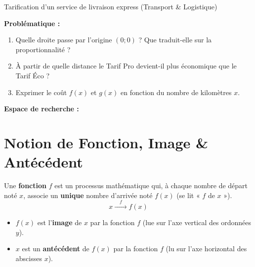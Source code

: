 \begin{activite}{Tarification d'un service de livraison express (Transport \& Logistique)}
\begin{minipage}[c]{0.48\linewidth}
\end{minipage}\hfill
\begin{minipage}[c]{0.50\linewidth}
\begin{tcolorbox}[colback=slate100, colframe=colPrimary, arc=4pt, boxrule=0.8pt, top=4pt, bottom=4pt, left=6pt, right=6pt]
\sffamily\footnotesize
\textbf{Problématique :}
\begin{enumerate}[leftmargin=1.2em, itemsep=2pt]
    \item Quelle droite passe par l'origine $(0;0)$ ? Que traduit-elle sur la proportionnalité ?
    \item À partir de quelle distance le Tarif Pro devient-il plus économique que le Tarif Éco ?
    \item Exprimer le coût $f(x)$ et $g(x)$ en fonction du nombre de kilomètres $x$.
\end{enumerate}
\end{tcolorbox}
\end{minipage}

\vspace{2mm}
\noindent\textbf{Espace de recherche :}
\lignesreponse[3]
\end{activite}

\section{Notion de Fonction, Image \& Antécédent}

\begin{cadredef}
Une \textbf{fonction} $f$ est un processus mathématique qui, à chaque nombre de départ noté $x$, associe un \textbf{unique} nombre d'arrivée noté $f(x)$ (se lit « $f$ de $x$ »).
\[ x \xrightarrow{\quad f \quad} f(x) \]
\begin{itemize}[leftmargin=1.5em, itemsep=2pt]
    \item $f(x)$ est l'\textbf{image} de $x$ par la fonction $f$ (lue sur l'axe vertical des ordonnées $y$).
    \item $x$ est un \textbf{antécédent} de $f(x)$ par la fonction $f$ (lu sur l'axe horizontal des abscisses $x$).
\end{itemize}
\end{cadredef}

